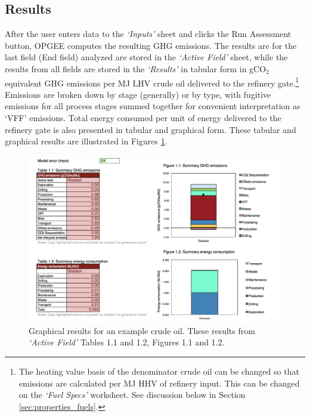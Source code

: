 \documentclass[11pt]{report}
\newcommand{\marg}[1]{{\footnotesize\textit{\textcolor{stanford}{'#1'}}}}
\newcommand{\marginnote}[1]{\marginpar{\marg{#1}}}
\newcommand{\sheet}[1]{\textit{`{#1}'}}
\begin{document}
\clearpage

\subsection{Results}

After the user enters data to the \sheet{Inputs} sheet and clicks the Run Assessment button, OPGEE computes the resulting GHG emissions. The results are for the last field (End field) analyzed are stored in the \sheet{Active Field} sheet, \marginnote{Active Field Table 1.1} while the results from all fields are stored in the \sheet{Results} in tabular form \marginnote{Results 2.1 - 2.14} in gCO$_2$ equivalent GHG emissions per MJ LHV crude oil delivered to the refinery gate.\footnote{The heating value basis of the denominator crude oil can be changed so that emissions are calculated per MJ HHV of refinery input. This can be changed on the \sheet{Fuel Specs} worksheet. See discussion below in Section \ref{sec:properties_fuels}.} Emissions are broken down by stage (generally) or by type, with fugitive emissions for all process stages summed together for convenient interpretation as `VFF' \marginnote{Active Field Fig. 1.1} emissions. Total energy consumed per unit of energy delivered to the refinery gate is also presented in tabular and graphical form. \marginnote{Active Field Table 1.2, Figure 1.2} These tabular and graphical results are illustrated in Figures \ref{fig:Results_example}.

\begin{figure}[t]
\includegraphics[width=1.2\columnwidth]{images/Results_Example.png}
\caption{Graphical results for an example crude oil. These results from \sheet{Active Field} Tables 1.1 and 1.2, Figures 1.1 and 1.2.}
\label{fig:Results_example}
\end{figure}
\end{document}
